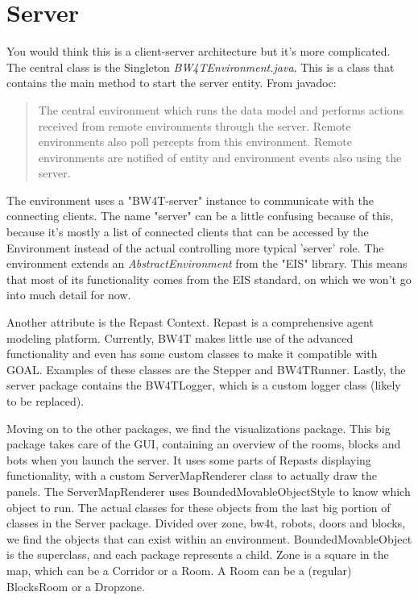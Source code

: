 \section*{Server} 
You would think this is a client-server architecture but it's more complicated. The central class is the Singleton \emph{BW4TEnvironment.java}. This is a class that contains the main method to start the server entity. From javadoc: 
\begin{quote}
The central environment which runs the data model and performs actions received from remote environments through the server. Remote environments also poll percepts from this environment. Remote environments are notified of entity and environment events also using the server. 
\end{quote}  

The environment uses a "BW4T-server" instance to communicate with the connecting clients. The name "server" can be a little confusing because of this, because it's mostly a list of connected clients that can be accessed by the Environment instead of the actual controlling more typical 'server' role.
The environment extends an \emph{AbstractEnvironment} from the "EIS" library. This means that most of its functionality comes from the EIS standard, on which we won't go into much detail for now. 

Another attribute is the Repast Context. Repast is a comprehensive agent modeling platform. Currently, BW4T makes little use of the advanced functionality and even has some custom classes to make it compatible with GOAL. Examples of these classes are the Stepper and BW4TRunner. Lastly, the server package contains the BW4TLogger, which is a custom logger class (likely to be replaced). %

Moving on to the other packages, we find the visualizations package. This big package takes care of the GUI, containing an overview of the rooms, blocks and bots when you launch the server. It uses some parts of Repasts displaying functionality, with a custom ServerMapRenderer class to actually draw the panels. The ServerMapRenderer uses BoundedMovableObjectStyle to know which object to run. The actual classes for these objects from the last big portion of classes in the Server package. Divided over zone, bw4t, robots, doors and blocks, we find the objects that can exist within an environment. BoundedMovableObject is the superclass, and each package represents a child. Zone is a square in the map, which can be a Corridor or a Room. A Room can be a (regular) BlocksRoom or a Dropzone. 